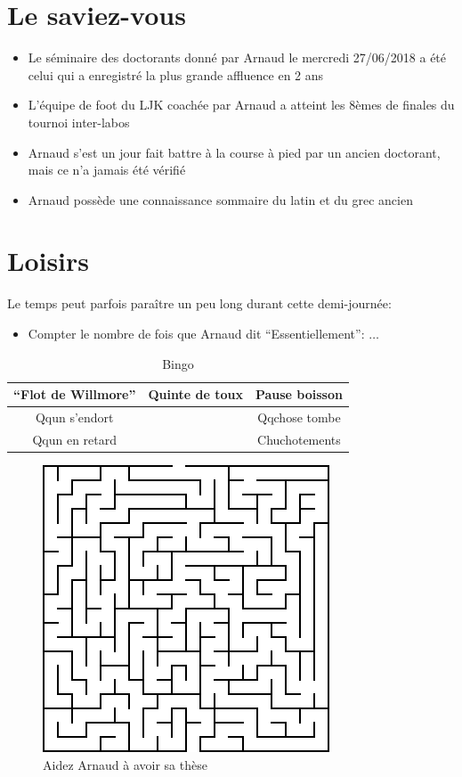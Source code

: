 \documentclass[a4paper]{leaflet}
\begin{document}
\section*{Le saviez-vous}
\begin{itemize}
\item Le séminaire des doctorants donné par Arnaud le mercredi 27/06/2018 a été celui qui a enregistré la plus grande affluence en 2 ans
\item L'équipe de foot du LJK coachée par Arnaud a atteint les 8èmes de finales du tournoi inter-labos
\item Arnaud s'est un jour fait battre à la course à pied par un ancien doctorant, mais ce n'a jamais été vérifié %
\item Arnaud possède une connaissance sommaire du latin et du grec ancien
\end{itemize}


\section*{Loisirs}
Le temps peut parfois paraître un peu long durant cette demi-journée:

\begin{itemize}
\item Compter le nombre de fois que Arnaud dit ``Essentiellement'': $\dots$
\end{itemize}

\begin{table}[!h] %
  \centering
  \begin{tabular}{*3{|c}|}\hline
    ``Flot de Willmore''& Quinte de toux & Pause boisson  \\ \hline
    Qqun s'endort & & Qqchose tombe \\ \hline
    Qqun en retard & & Chuchotements \\ \hline
  \end{tabular}
  \caption{Bingo}
\end{table}

\begin{figure}
  \caption{Aidez Arnaud à avoir sa thèse}
\includegraphics{maz.png}
\end{figure}
\end{document}
